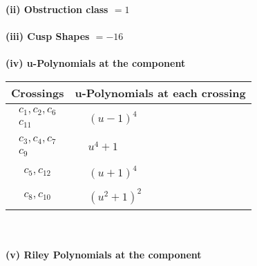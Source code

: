 \documentclass[1p]{elsarticle_modified}
\theoremstyle{definition}
\begin{document}
\flushleft \textbf{(ii) Obstruction class $= 1$}\\~\\
\flushleft \textbf{(iii) Cusp Shapes $= -16$}\\~\\
\newpage\renewcommand{\arraystretch}{1}
\flushleft \textbf{(iv) u-Polynomials at the component}\newline \\
\begin{tabular}{m{50pt}|m{274pt}}
Crossings & \hspace{64pt}u-Polynomials at each crossing \\
\hline $$\begin{aligned}c_{1},c_{2},c_{6}\\c_{11}\end{aligned}$$&$\begin{aligned}
&(u-1)^4
\end{aligned}$\\
\hline $$\begin{aligned}c_{3},c_{4},c_{7}\\c_{9}\end{aligned}$$&$\begin{aligned}
&u^4+1
\end{aligned}$\\
\hline $$\begin{aligned}c_{5},c_{12}\end{aligned}$$&$\begin{aligned}
&(u+1)^4
\end{aligned}$\\
\hline $$\begin{aligned}c_{8},c_{10}\end{aligned}$$&$\begin{aligned}
&(u^2+1)^2
\end{aligned}$\\
\hline
\end{tabular}\\~\\
\newpage\renewcommand{\arraystretch}{1}
\flushleft \textbf{(v) Riley Polynomials at the component}\newline \\
\end{document}
